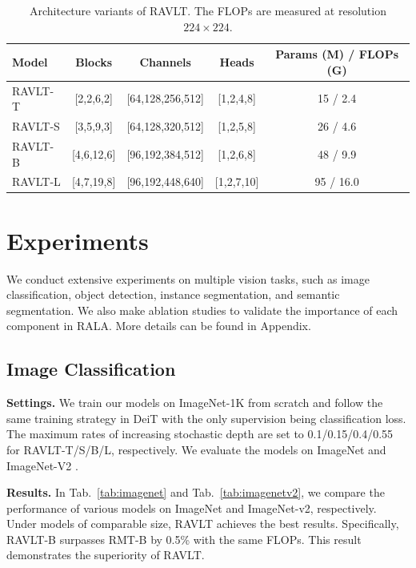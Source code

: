\documentclass[10pt,twocolumn,letterpaper]{article}
\begin{document}
\begin{table}[h]
\centering
\caption{Architecture variants of RAVLT. The FLOPs are measured at resolution $224 \times 224$.}
\label{tab:architecture}
\small
\begin{tabular}{lcccc}
\toprule
Model & Blocks & Channels & Heads & Params (M) / FLOPs (G) \\
\midrule
RAVLT-T & [2,2,6,2]   & [64,128,256,512]   & [1,2,4,8]   & 15 / 2.4 \\
RAVLT-S & [3,5,9,3]   & [64,128,320,512]   & [1,2,5,8]   & 26 / 4.6 \\
RAVLT-B & [4,6,12,6]  & [96,192,384,512]   & [1,2,6,8]   & 48 / 9.9 \\
RAVLT-L & [4,7,19,8]  & [96,192,448,640]   & [1,2,7,10]  & 95 / 16.0 \\
\bottomrule
\end{tabular}
\end{table}

\section{Experiments}

We conduct extensive experiments on multiple vision tasks, such as image classification, object detection, instance segmentation, and semantic segmentation. We also make ablation studies to validate the importance of each component in RALA. More details can be found in Appendix.

\subsection{Image Classification}

\textbf{Settings.} We train our models on ImageNet-1K \cite{deng2009imagenet} from scratch and follow the same training strategy in DeiT \cite{touvron2021training} with the only supervision being classification loss. The maximum rates of increasing stochastic depth \cite{huang2016deep} are set to 0.1/0.15/0.4/0.55 for RAVLT-T/S/B/L, respectively. We evaluate the models on ImageNet \cite{deng2009imagenet} and ImageNet-V2 \cite{recht2019imagenet}.

\textbf{Results.} In Tab.~\ref{tab:imagenet} and Tab.~\ref{tab:imagenetv2}, we compare the performance of various models on ImageNet and ImageNet-v2, respectively. Under models of comparable size, RAVLT achieves the best results. Specifically, RAVLT-B surpasses RMT-B by 0.5\% with the same FLOPs. This result demonstrates the superiority of RAVLT.
\end{document}
